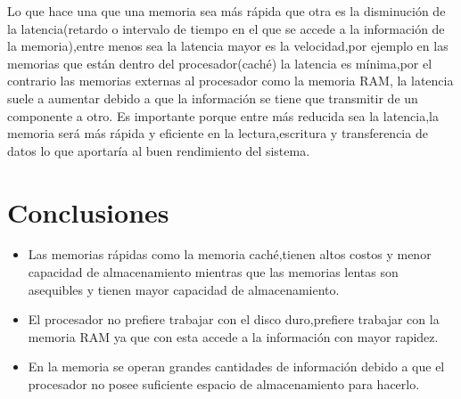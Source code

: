 \documentclass{article}
\begin{document}
Lo que hace una que una memoria sea más rápida que otra es la disminución de la latencia(retardo o intervalo de tiempo en el que se  accede a la información de la memoria),entre menos sea la latencia mayor es la velocidad,por ejemplo en las memorias que están dentro del procesador(caché) la latencia es mínima,por el contrario las memorias externas al  procesador como la memoria RAM,  la latencia suele a aumentar debido a que  la información se tiene que transmitir de un componente a otro. 
Es importante  porque entre más reducida sea la latencia,la memoria será más rápida y eficiente en la lectura,escritura y transferencia de datos lo que aportaría al buen rendimiento del sistema.\newpage




\section{Conclusiones}
\begin{itemize}
    \item{Las memorias  rápidas como la memoria caché,tienen altos costos y menor capacidad de almacenamiento mientras que las memorias lentas son asequibles y tienen mayor capacidad de almacenamiento. }
    \item{El procesador no prefiere trabajar con el disco duro,prefiere trabajar con la memoria RAM ya que con esta  accede a la información con mayor rapidez.}
    \item{En la memoria se operan grandes cantidades de información debido a que el procesador no posee suficiente espacio de almacenamiento para hacerlo. }
\end{itemize}




\newpage
    




\end{document}
